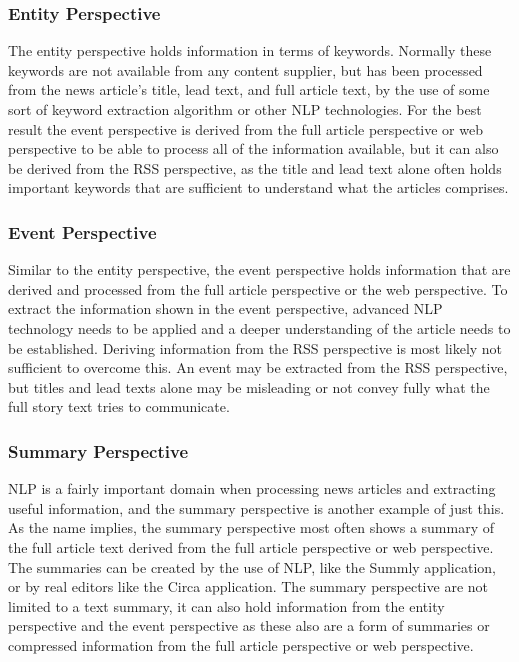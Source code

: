 \subsubsection{Entity Perspective}
The entity perspective holds information in terms of keywords. Normally these keywords are not available from any content supplier, but has been processed from the news article's title, lead text, and full article text, by the use of some sort of keyword extraction algorithm or other NLP technologies. For the best result the event perspective is derived from the full article perspective or web perspective to be able to process all of the information available, but it can also be derived from the RSS perspective, as the title and lead text alone often holds important keywords that are sufficient to understand what the articles comprises.

\subsubsection{Event Perspective}
Similar to the entity perspective, the event perspective holds information that are derived and processed from the full article perspective or the web perspective. To extract the information shown in the event perspective, advanced NLP technology needs to be applied and a deeper understanding of the article needs to be established. Deriving information from the RSS perspective is most likely not sufficient to overcome this. An event may be extracted from the RSS perspective, but titles and lead texts alone may be misleading or not convey fully what the full story text tries to communicate.

\subsubsection{Summary Perspective}
NLP is a fairly important domain when processing news articles and extracting useful information, and the summary perspective is another example of just this. As the name implies, the summary perspective most often shows a summary of the full article text derived from the full article perspective or web perspective. The summaries can be created by the use of NLP, like the Summly application, or by real editors like the Circa application. The summary perspective are not limited to a text summary, it can also hold information from the entity perspective and the event perspective as these also are a form of summaries or compressed information from the full article perspective or web perspective.

